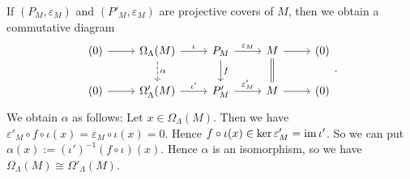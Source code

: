 
\begin{remark}
  If $(P_M,\varepsilon_M)$ and $(P'_M,\varepsilon_M)$ are projective covers of $M$, then we
  obtain a commutative diagram
    \[
      \begin{tikzcd}
        (0) \rar & \Omega_\Lambda(M) \ar[d, dashrightarrow, "\alpha"] \rar["\iota"]&  P_M \ar[d, "f"] \rar["\varepsilon_M"]& M \ar[d, equal] \rar & (0)\\
        (0) \rar & \Omega'_\Lambda(M)                            \rar["\iota'"]& P'_M            \rar["\varepsilon'_M"]& M              \rar & (0)
      \end{tikzcd}.
    \]
    We obtain $\alpha$ as follows: Let $x \in \Omega_\Lambda(M)$. Then we have $\varepsilon'_M\circ f\circ\iota(x) = \varepsilon_M \circ \iota(x) = 0$. Hence $f \circ \iota(x) \in \ker \varepsilon'_M = \operatorname{im} \iota'$. So we can put $\alpha(x) := (\iota')^{-1}(f \circ \iota)(x)$.
    Hence $\alpha$ is an isomorphism, so we have $\Omega_\Lambda(M) \cong \Omega'_\Lambda(M)$.
\end{remark}

